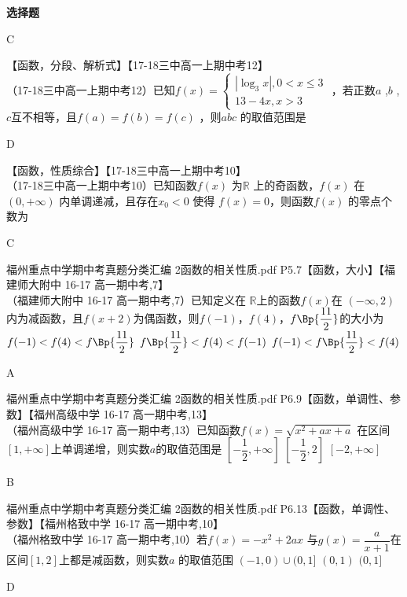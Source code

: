 \begin{exercise}{\bf 选择题}
      \begin{answer}
        C
      \end{answer}
    \item 【函数，分段、解析式】【17-18三中高一上期中考12】\\
      （17-18三中高一上期中考12）已知$f(x)=\begin{cases}
       |\log_3x|,0<x\leq3\\13-4x,x>3
      \end{cases} $ ，若正数$a$ ,$b$ , $c$互不相等，且$f(a)=f(b)=f(c)$ ，则$abc$ 的取值范围是\xz
      \begin{answer}
        D
      \end{answer}
    \item 【函数，性质综合】【17-18三中高一上期中考10】\\
      （17-18三中高一上期中考10）已知函数$f(x)$ 为$\mathbb{R}$ 上的奇函数，$f(x)$ 在$(0,+\infty)$ 内单调递减，且存在$x_0<0$ 使得 $f(x)=0$，则函数$f(x)$ 的零点个数为\xz
      \begin{answer}
        C
      \end{answer}
    \item 福州重点中学期中考真题分类汇编 2函数的相关性质.pdf P5.7【函数，大小】【福建师大附中 16-17 高一期中考,7】\\
      （福建师大附中 16-17 高一期中考,7）已知定义在 $\mathbb{R}$上的函数$f(x)$在 $(-\infty,2)$内为减函数，且$f(x+2) $为偶函数，则$f(-1)$，$f(4)$，$f\Bp{\dfrac{11}2}$的大小为\xz \\
      	  {$f(-1)<f(4)<f\Bp{\dfrac{11}2}$}
          {$f\Bp{\dfrac{11}2}<f(4)<f(-1)$}
          {$f(-1)<f\Bp{\dfrac{11}2}<f(4)$}
      \begin{answer}A\end{answer}
    \item 福州重点中学期中考真题分类汇编 2函数的相关性质.pdf P6.9【函数，单调性、参数】【福州高级中学 16-17 高一期中考,13】\\
      （福州高级中学 16-17 高一期中考,13）已知函数$f(x)=\sqrt{x^2+ax+a} $ 在区间$[1,+\infty] $上单调递增，则实数$a$的取值范围是\xz
      \xx{$[-2,-\dfrac12]$}
      		{$[-\dfrac12,+\infty] $}
          {$[-\dfrac12,2] $}
          {$[-2,+\infty] $}
      \begin{answer}B\end{answer}
    \item 福州重点中学期中考真题分类汇编 2函数的相关性质.pdf P6.13【函数，单调性、参数】【福州格致中学 16-17 高一期中考,10】\\
      （福州格致中学 16-17 高一期中考,10）若$f(x)=-x^2+2ax $
       与$g(x)=\dfrac a{x+1} $在区间$[1,2] $上都是减函数，则实数$a $ 的取值范围\xz
       		 {$(-1,0)\cup (0,1]$}
           {$(0,1) $}
           {$(0,1]$}
       \begin{answer} D \end{answer}
    \end{exercise}
